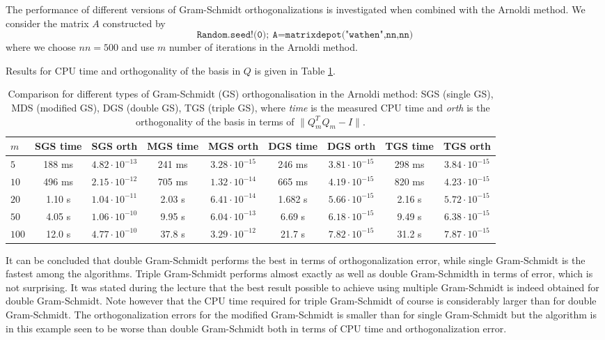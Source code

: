 The performance of different versions of Gram-Schmidt orthogonalizations is investigated when combined with the Arnoldi method. We consider the matrix $A$ constructed by
\begin{equation}
\texttt{Random.seed!(0)};\medspace\texttt{A=matrixdepot("wathen",nn,nn)}
\end{equation}
where we choose $nn=500$ and use $m$ number of iterations in the Arnoldi method.  

Results for CPU time and orthogonality of the basis in $Q$ is given in Table \ref{task3_tab}.

\begin{table}[h]
\centering
\caption{Comparison for different types of Gram-Schmidt (GS) orthogonalisation in the Arnoldi method: SGS (single GS), MDS (modified GS), DGS (double GS), TGS (triple GS), where \emph{time} is the measured CPU time and \emph{orth} is the orthogonality of the basis in terms of $\|Q_m^TQ_m-I\|$.}
\label{task3_tab}
\begin{tabular}{l || c | c|| c | c || c | c|| c | c}
$m$& SGS time & SGS orth & MGS time & MGS orth & DGS time & DGS orth & TGS time & TGS orth \\ \hline 
$5$ & 188 ms& $4.82\cdot 10^{-13}$&241 ms & $3.28\cdot 10^{-15}$ &246 ms &$3.81\cdot 10^{-15}$ &298 ms & $3.84\cdot 10^{-15}$ \\
$10$ & 496 ms& $2.15\cdot 10^{-12}$ &705 ms &$1.32\cdot 10^{-14}$ & 665 ms&$4.19\cdot 10^{-15}$ & 820 ms& $4.23\cdot 10^{-15}$ \\
$20$ & 1.10 s& $1.04\cdot 10^{-11}$&2.03 s &$6.41\cdot 10^{-14}$ &1.682 s & $5.66\cdot 10^{-15}$ & 2.16 s & $5.72\cdot 10^{-15}$\\
$50$ & 4.05 s&$1.06\cdot 10^{-10}$ &9.95 s &$6.04\cdot 10^{-13}$ &6.69 s & $6.18\cdot 10^{-15}$& 9.49 s & $6.38\cdot 10^{-15}$\\
$100$ & 12.0 s&$4.77\cdot 10^{-10}$  & 37.8 s &$3.29\cdot 10^{-12}$ & 21.7 s&$7.82\cdot 10^{-15}$ & 31.2 s& $7.87\cdot 10^{-15}$ \\
\end{tabular}

\end{table}

It can be concluded that double Gram-Schmidt performs the best in terms of orthogonalization error, while single Gram-Schmidt is the fastest among the algorithms. Triple Gram-Schmidt performs almost exactly as well as double Gram-Schmidth in terms of error, which is not surprising. It was stated during the lecture that the best result possible to achieve using multiple Gram-Schmidt is indeed obtained for double Gram-Schmidt. Note however that the CPU time required for triple Gram-Schmidt of course is considerably larger than for double Gram-Schmidt. The orthogonalization errors for the modified Gram-Schmidt is smaller than for single Gram-Schmidt but the algorithm is in this example seen to be worse than double Gram-Schmidt both in terms of CPU time and orthogonalization error. 


